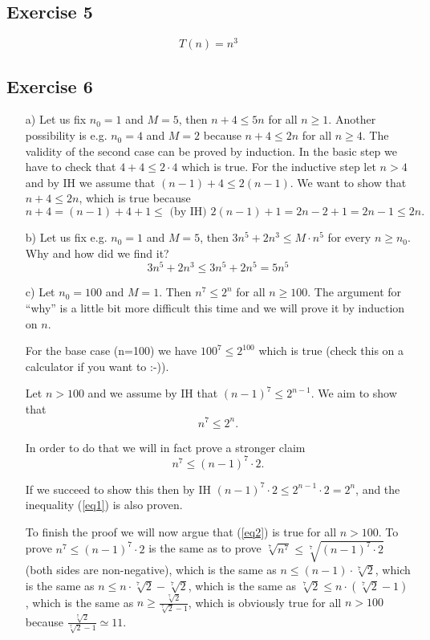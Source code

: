 \documentclass[english]{article}
\begin{document}
\subsection*{Exercise 5} 

$$T(n) = n^3$$

\subsection*{Exercise 6} 

\begin{itemize}
\item[a)] Let us fix $n_0=1$ and $M=5$, then
  $n+4 \leq 5n$ for all $n\geq 1$. Another
  possibility is e.g. $n_0=4$ and $M=2$ because
  $n+4 \leq 2n$ for all $n \geq 4$. The validity
  of the second case can be proved by induction.
  In the basic step we have to check that  $4+4 \leq 2\cdot 4$
  which is true. For the inductive step
  let $n>4$ and by IH we assume 
  that $(n-1) + 4 \leq 2(n-1)$. We want to show that
  $n + 4 \leq 2n$, which is true because
  $$n+4 = (n-1) + 4 + 1 \leq \mbox{ (by IH) }
  2(n-1) +1 = 2n - 2 + 1 = 2n -1 \leq 2n.$$
 
\item[b)] Let us fix e.g. $n_0 = 1$ and $M=5$, then
$3n^5 + 2n^3 \leq M\cdot n^5$ for every $n \geq n_0$.
Why and how did we find it?
$$3n^5 + 2n^3 \leq 3n^5 + 2n^5 = 5n^5$$

\item[c)] Let $n_0=100$ and $M=1$. Then $n^7 \leq 2^n$ for all 
$n \geq 100$. The argument for ``why'' is a little bit more difficult
this time and we will prove it by induction on $n$.

For the base case (n=100) we have 
$100^7 \leq 2^{100}$ which is true (check this on a calculator if you want
 to :-)).

Let $n>100$ and we assume by IH that $(n-1)^7 \leq 2^{n-1}$.
We aim to show that 
\begin{equation} \label{eq1}
n^7 \leq 2^n.
\end{equation}

In order to do that we will in fact prove a stronger claim 
\begin{equation} \label{eq2}
n^7 \leq (n-1)^7\cdot 2.
\end{equation}

If we succeed  to show this then by IH 
$(n-1)^7\cdot 2 \leq 2^{n-1}\cdot 2 = 2^n$, and
the inequality (\ref{eq1}) is also proven.

To finish the proof we will now argue that (\ref{eq2}) is true
for all $n > 100$.
To prove $n^7 \leq (n-1)^7\cdot 2$ is the same as to prove
$\sqrt[7]{n^7} \leq \sqrt[7]{(n-1)^7\cdot 2}$
(both sides are non-negative), which is the
same as $n \leq (n-1)\cdot  \sqrt[7]{2}$, which is the same
as $n \leq n\cdot  \sqrt[7]{2} - \sqrt[7]{2}$, which is the same as
$\sqrt[7]{2} \leq n\cdot (\sqrt[7]{2} - 1)$, which is the same as
$n \geq \frac{\sqrt[7]{2}}{\sqrt[7]{2} - 1}$, which is obviously true
for all $n > 100$ because $\frac{\sqrt[7]{2}}{\sqrt[7]{2} - 1} \simeq 11$.




\end{itemize}
\end{document}
